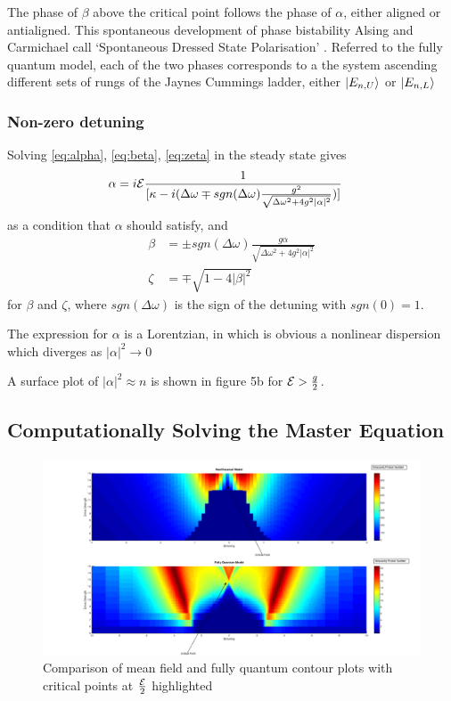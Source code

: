 The phase of $\beta$ above the critical point follows the phase of $\alpha$, either aligned or antialigned. This spontaneous development of phase bistability Alsing and Carmichael call `Spontaneous Dressed State Polarisation' \autocite{Alsing1999}. Referred to the fully quantum model, each of the two phases corresponds to a the system ascending different sets of rungs of the Jaynes Cummings ladder, either $| E_{n, U} \rangle$ or $| E_{n, L} \rangle$
\subsubsection{Non-zero detuning}
Solving \cref{eq:alpha}, \cref{eq:beta}, \cref{eq:zeta} in the steady state gives
\begin{align}
  \alpha& = i \mathcal{E}\frac{1}{[\kappa-i(\Delta \omega \mp sgn(\Delta \omega) \frac{g^2}{\sqrt{\Delta \omega^2 +4g^2 |\alpha|^2}})]}
\end{align}
as a condition that $\alpha$ should satisfy, and
\begin{align}
  \beta& = \pm sgn(\Delta \omega) \frac{g \alpha}{\sqrt{\Delta \omega^2 + 4 g^2 |\alpha|^2}}\\
  \zeta& = \mp \sqrt{1-4|\beta|^2}
\end{align}
for $\beta$ and $\zeta$, where $sgn(\Delta \omega)$ is the sign of the detuning with $sgn(0) = 1$.

The expression for $\alpha$ is a Lorentzian, in which is obvious a nonlinear dispersion which diverges as $|\alpha|^2 \rightarrow 0$

A surface plot of $|\alpha|^2 \approx n$ is shown in figure 5b for $\mathcal{E}>\frac{g}{2}$.
\subsection{Computationally Solving the Master Equation}
\begin{figure}[h]
 \centering
 \includegraphics[width=1\textwidth]{Images/MeanFieldvsQuantum.png}
 \caption{Comparison of mean field and fully quantum contour plots with critical points at $\frac{\mathcal{E}}{2}$ highlighted}\label{fig:MeanFieldvsQuantum}
 \end{figure}


